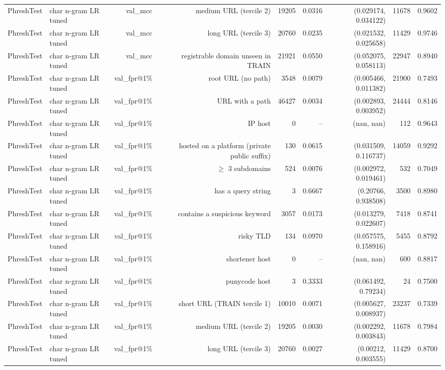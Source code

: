 \begin{table}[t]
\begin{tabular}{llrrrrrrr}
PhreshTest & char n-gram LR tuned & val\_mcc & medium URL (tercile 2) & 19205 & 0.0316 & (0.029174, 0.034122) & 11678 & 0.9602 \\
PhreshTest & char n-gram LR tuned & val\_mcc & long URL (tercile 3) & 20760 & 0.0235 & (0.021532, 0.025658) & 11429 & 0.9746 \\
PhreshTest & char n-gram LR tuned & val\_mcc & registrable domain unseen in TRAIN & 21921 & 0.0550 & (0.052075, 0.058113) & 22947 & 0.8940 \\
PhreshTest & char n-gram LR tuned & val\_fpr@1\% & root URL (no path) & 3548 & 0.0079 & (0.005466, 0.011382) & 21900 & 0.7493 \\
PhreshTest & char n-gram LR tuned & val\_fpr@1\% & URL with a path & 46427 & 0.0034 & (0.002893, 0.003952) & 24444 & 0.8146 \\
PhreshTest & char n-gram LR tuned & val\_fpr@1\% & IP host & 0 & -- & (nan, nan) & 112 & 0.9643 \\
PhreshTest & char n-gram LR tuned & val\_fpr@1\% & hosted on a platform (private public suffix) & 130 & 0.0615 & (0.031509, 0.116737) & 14059 & 0.9292 \\
PhreshTest & char n-gram LR tuned & val\_fpr@1\% & $\geq$ 3 subdomains & 524 & 0.0076 & (0.002972, 0.019461) & 532 & 0.7049 \\
PhreshTest & char n-gram LR tuned & val\_fpr@1\% & has a query string & 3 & 0.6667 & (0.20766, 0.938508) & 3500 & 0.8980 \\
PhreshTest & char n-gram LR tuned & val\_fpr@1\% & contains a suspicious keyword & 3057 & 0.0173 & (0.013279, 0.022607) & 7418 & 0.8741 \\
PhreshTest & char n-gram LR tuned & val\_fpr@1\% & risky TLD & 134 & 0.0970 & (0.057575, 0.158916) & 5455 & 0.8792 \\
PhreshTest & char n-gram LR tuned & val\_fpr@1\% & shortener host & 0 & -- & (nan, nan) & 600 & 0.8817 \\
PhreshTest & char n-gram LR tuned & val\_fpr@1\% & punycode host & 3 & 0.3333 & (0.061492, 0.79234) & 24 & 0.7500 \\
PhreshTest & char n-gram LR tuned & val\_fpr@1\% & short URL (TRAIN tercile 1) & 10010 & 0.0071 & (0.005627, 0.008937) & 23237 & 0.7339 \\
PhreshTest & char n-gram LR tuned & val\_fpr@1\% & medium URL (tercile 2) & 19205 & 0.0030 & (0.002292, 0.003843) & 11678 & 0.7984 \\
PhreshTest & char n-gram LR tuned & val\_fpr@1\% & long URL (tercile 3) & 20760 & 0.0027 & (0.00212, 0.003555) & 11429 & 0.8700 \\

\end{tabular}
\end{table}
